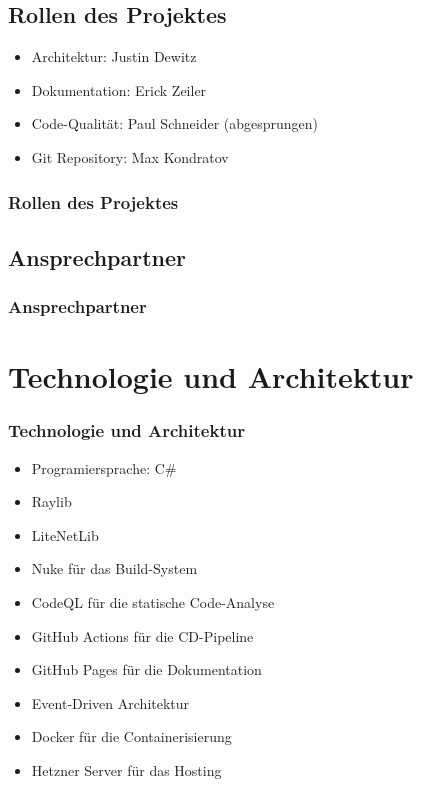 \documentclass{beamer}
\begin{document}
\subsection{Rollen des Projektes}
\begin{frame}
  \begin{itemize}
    \item Architektur: Justin Dewitz
    \item Dokumentation: Erick Zeiler
    \item Code-Qualität: Paul Schneider (abgesprungen)
    \item Git Repository: Max Kondratov
  \end{itemize}
\frametitle{Rollen des Projektes}

\end{frame}

\subsection{Ansprechpartner}
\begin{frame}
\frametitle{Ansprechpartner}

\end{frame}

\section{Technologie und Architektur}
\begin{frame}
\frametitle{Technologie und Architektur}
  \begin{itemize}
    \item Programiersprache: C\#
    \item Raylib
    \item LiteNetLib
    \item Nuke für das Build-System
    \item CodeQL für die statische Code-Analyse
    \item GitHub Actions für die CD-Pipeline
    \item GitHub Pages für die Dokumentation
    \item Event-Driven Architektur
    \item Docker für die Containerisierung
    \item Hetzner Server für das Hosting
  \end{itemize}
\end{frame}
\end{document}
